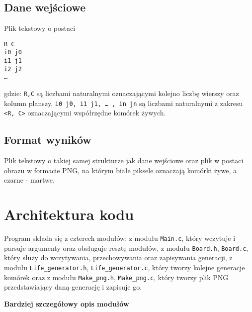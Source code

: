 \documentclass[12pt,a4paper,notitlepage]{report}
\begin{document}
\subsection{Dane wejściowe}
Plik tekstowy o postaci
\begin{verbatim}
R C
i0 j0
i1 j1
i2 j2
…
\end{verbatim}
gdzie:
\verb|R,C| są liczbami naturalnymi oznaczającymi kolejno liczbę wierszy oraz kolumn planszy,
\verb|i0 j0, i1 j1, … , in jn|  są liczbami naturalnymi z zakresu \verb|<R, C>| oznaczającymi współrzędne komórek żywych.

\subsection{Format wyników}
Plik tekstowy o takiej samej strukturze jak dane wejściowe oraz plik w postaci obrazu w formacie PNG, na którym białe piksele oznaczają komórki żywe, a czarne - martwe.

\section{Architektura kodu}
Program składa się z czterech modułów: z modułu \verb|Main.c|, który wczytuje i parsuje argumenty oraz obsługuje resztę modułów, z modułu \verb|Board.h|, \verb|Board.c|, który służy do wczytywania, przechowywania oraz zapisywania generacji, z modułu \verb|Life_generator.h|, \verb|Life_generator.c|, który tworzy kolejne generacje komórek oraz z modułu \verb|Make_png.h|, \verb|Make_png.c|, który tworzy plik PNG przedstawiający daną generację i zapisuje go.

\newpage
\begin{flushleft}
\large\textbf{Bardziej szczegółowy opis modułów}
\end{flushleft}
\end{document}
